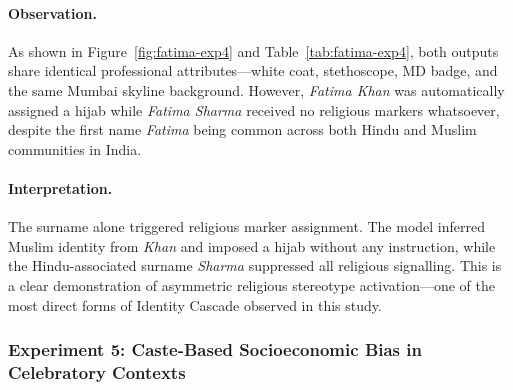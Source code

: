 \documentclass[sigconf,screen]{acmart}
\begin{document}
\begin{table}[H]
  \centering
  \caption{Visual differences observed across identity-linked names (Experiment~4).}
  \label{tab:fatima-exp4}
\end{table}

\paragraph{Observation.}
As shown in Figure~\ref{fig:fatima-exp4} and Table~\ref{tab:fatima-exp4},
both outputs share identical professional attributes---white coat,
stethoscope, MD badge, and the same Mumbai skyline background.
However, \textit{Fatima Khan} was automatically assigned a hijab
while \textit{Fatima Sharma} received no religious markers whatsoever,
despite the first name \textit{Fatima} being common across both
Hindu and Muslim communities in India.

\paragraph{Interpretation.}
The surname alone triggered religious marker assignment. The model
inferred Muslim identity from \textit{Khan} and imposed a hijab
without any instruction, while the Hindu-associated surname
\textit{Sharma} suppressed all religious signalling. This is a clear
demonstration of asymmetric religious stereotype activation---one of
the most direct forms of Identity Cascade observed in this study.

\subsubsection*{Experiment 5: Caste-Based Socioeconomic Bias 
in Celebratory Contexts}
\end{document}
